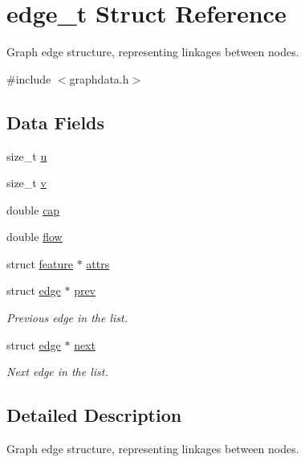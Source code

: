 \hypertarget{structedge__t}{}\section{edge\+\_\+t Struct Reference}
\label{structedge__t}


Graph edge structure, representing linkages between nodes.  




{\ttfamily \#include $<$graphdata.\+h$>$}

\subsection*{Data Fields}
\begin{DoxyCompactItemize}
\item 
size\+\_\+t \hyperlink{structedge__t_a2bd21781f62242a78e70595ea781769c}{u}
\item 
size\+\_\+t \hyperlink{structedge__t_a23bf912e6f3c953e2f8577ab7c692e85}{v}
\item 
double \hyperlink{structedge__t_a008f610ba47f30e49b6350e4bb00d6aa}{cap}
\item 
double \hyperlink{structedge__t_a45d88baf5d0fa8abd4b512e6856b9b2d}{flow}
\item 
struct \hyperlink{graphdata_8h_a068417678f021a74e911edd39f8d0bce}{feature} $\ast$ \hyperlink{structedge__t_ab2d506a2def85cee084a5e4691bae746}{attrs}
\item 
struct \hyperlink{graphdata_8h_a641a8a4cd064e02a13e6c15d1b2df541}{edge} $\ast$ \hyperlink{structedge__t_a67691a9d896d973292ad9cf3e8901111}{prev}
\begin{DoxyCompactList}\small\item\em Previous edge in the list. \end{DoxyCompactList}\item 
struct \hyperlink{graphdata_8h_a641a8a4cd064e02a13e6c15d1b2df541}{edge} $\ast$ \hyperlink{structedge__t_ae9f9c230f5fc9409f88af96ef17a23fa}{next}
\begin{DoxyCompactList}\small\item\em Next edge in the list. \end{DoxyCompactList}\end{DoxyCompactItemize}


\subsection{Detailed Description}
Graph edge structure, representing linkages between nodes. 


